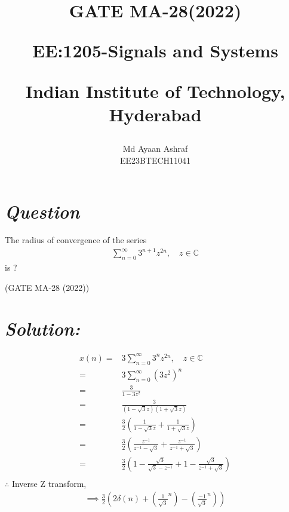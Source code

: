 \documentclass[journal,12pt,twocolumn]{IEEEtran}
\theoremstyle{remark}
\begin{document}
%




\vspace{3cm}

\title{
GATE MA-28(2022) 

\large{EE:1205-Signals and Systems}

Indian Institute of Technology, Hyderabad
}
\author{Md Ayaan Ashraf

EE23BTECH11041
}	

\maketitle

\newpage


\bigskip
\renewcommand{\thefigure}{\arabic{figure}}
\renewcommand{\thetable}{\arabic{table}}
\section*{\textit{\textbf{Question}}}
The radius of convergence of the series
\begin{align}
    \sum_{n=0}^{\infty} 3^{n+1}z^{2n}, \quad z \in \mathbb{C} \nonumber{}
\end{align}is ?

\hfill {(GATE MA-28 (2022))}
\section*{\textit{\textbf{Solution:}}}

\begin{align}
x(n) =& 3\sum_{n=0}^{\infty} 3^{n}z^{2n}, \quad z \in \mathbb{C}\\
=&3\sum_{n=0}^{\infty} {(3z^{2})}^{n}\\
=&\frac{3}{1-3z^{2}}\\
    =& \frac{3}{(1-\sqrt{3}z)(1+\sqrt{3}z)}\\
    =& \frac{3}{2} \left(\frac{1}{1-\sqrt{3}z}+\frac{1}{1+\sqrt{3}z}\right)\\
    =&\frac{3}{2}\left(\frac{z^{-1}}{z^{-1}-\sqrt{3}}+\frac{z^{-1}}{z^{-1}+\sqrt{3}}\right)\\
    =&\frac{3}{2}\left(1- \frac{\sqrt{3}}{\sqrt{3}-z^{-1}}+1 -\frac{\sqrt{3}}{z^{-1}+\sqrt{3}}\right)\\
    \end{align}
     $\therefore$ Inverse Z transform,
     \begin{align}
    \implies \frac{3}{2}\left(2\delta(n)+ \left(\frac{1}{\sqrt{3}}^n\right) - \left(\frac{-1}{\sqrt{3}}^n\right)\right)
\end{align}  
\end{document}
